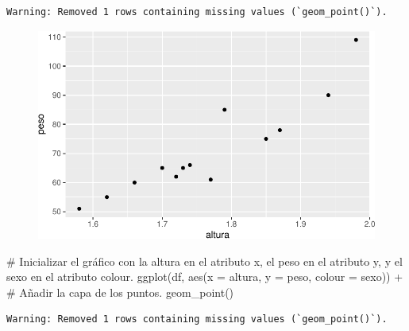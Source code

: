 \documentclass[
  a4paper,
]{scrreport}
\newenvironment{Shaded}{\begin{snugshade}}{\end{snugshade}}
\newcommand{\AttributeTok}[1]{\textcolor[rgb]{0.40,0.45,0.13}{#1}}
\newcommand{\CommentTok}[1]{\textcolor[rgb]{0.37,0.37,0.37}{#1}}
\newcommand{\FunctionTok}[1]{\textcolor[rgb]{0.28,0.35,0.67}{#1}}
\newcommand{\NormalTok}[1]{\textcolor[rgb]{0.00,0.23,0.31}{#1}}
\newcommand{\SpecialCharTok}[1]{\textcolor[rgb]{0.37,0.37,0.37}{#1}}
\theoremstyle{definition}
\theoremstyle{definition}
\theoremstyle{remark}
\begin{document}
\begin{verbatim}
Warning: Removed 1 rows containing missing values (`geom_point()`).
\end{verbatim}

\begin{figure}[H]

{\centering \includegraphics{07-graficos_files/figure-pdf/unnamed-chunk-4-1.pdf}

}

\end{figure}

\begin{Shaded}
\begin{Highlighting}[]
\CommentTok{\# Inicializar el gráfico con la altura en el atributo x, el peso en el atributo y, y el sexo en el atributo colour.}
\FunctionTok{ggplot}\NormalTok{(df, }\FunctionTok{aes}\NormalTok{(}\AttributeTok{x =}\NormalTok{ altura, }\AttributeTok{y =}\NormalTok{ peso, }\AttributeTok{colour =}\NormalTok{ sexo)) }\SpecialCharTok{+}
\CommentTok{\# Añadir la capa de los puntos.}
    \FunctionTok{geom\_point}\NormalTok{()}
\end{Highlighting}
\end{Shaded}

\begin{verbatim}
Warning: Removed 1 rows containing missing values (`geom_point()`).
\end{verbatim}
\end{document}
